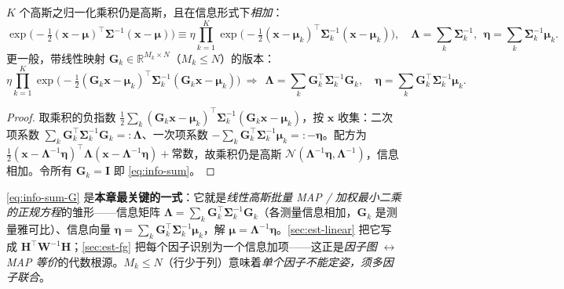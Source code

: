 \begin{proposition}[高斯归一化乘积 $=$ 独立观测融合 $=$ 信息相加]\label{prop:info-add}
$K$ 个高斯之归一化乘积仍是高斯，且在信息形式下\emph{相加}：
\begin{equation}
  \exp\!\Big(-\tfrac12(\mathbf{x}-\boldsymbol{\mu})^\top\boldsymbol{\Sigma}^{-1}(\mathbf{x}-\boldsymbol{\mu})\Big)
  \equiv\eta\prod_{k=1}^{K}\exp\!\Big(-\tfrac12(\mathbf{x}-\boldsymbol{\mu}_k)^\top\boldsymbol{\Sigma}_k^{-1}(\mathbf{x}-\boldsymbol{\mu}_k)\Big),
  \quad
  \boldsymbol{\Lambda}=\sum_{k}\boldsymbol{\Sigma}_k^{-1},\ \ \boldsymbol{\eta}=\sum_{k}\boldsymbol{\Sigma}_k^{-1}\boldsymbol{\mu}_k.
  \label{eq:info-sum}
\end{equation}
更一般，带线性映射 $\mathbf{G}_k\in\mathbb{R}^{M_k\times N}$（$M_k\le N$）的版本：
\begin{equation}
  \eta\prod_{k=1}^{K}\exp\!\Big(-\tfrac12(\mathbf{G}_k\mathbf{x}-\boldsymbol{\mu}_k)^\top\boldsymbol{\Sigma}_k^{-1}(\mathbf{G}_k\mathbf{x}-\boldsymbol{\mu}_k)\Big)
  \ \Rightarrow\
  \boxed{\ \boldsymbol{\Lambda}=\sum_{k}\mathbf{G}_k^\top\boldsymbol{\Sigma}_k^{-1}\mathbf{G}_k,\quad
  \boldsymbol{\eta}=\sum_{k}\mathbf{G}_k^\top\boldsymbol{\Sigma}_k^{-1}\boldsymbol{\mu}_k.\ }
  \label{eq:info-sum-G}
\end{equation}
\end{proposition}
\begin{proof}
取乘积的负指数 $\tfrac12\sum_k(\mathbf{G}_k\mathbf{x}-\boldsymbol{\mu}_k)^\top\boldsymbol{\Sigma}_k^{-1}(\mathbf{G}_k\mathbf{x}-\boldsymbol{\mu}_k)$，按 $\mathbf{x}$ 收集：二次项系数 $\sum_k\mathbf{G}_k^\top\boldsymbol{\Sigma}_k^{-1}\mathbf{G}_k=:\boldsymbol{\Lambda}$、一次项系数 $-\sum_k\mathbf{G}_k^\top\boldsymbol{\Sigma}_k^{-1}\boldsymbol{\mu}_k=:-\boldsymbol{\eta}$。配方为 $\tfrac12(\mathbf{x}-\boldsymbol{\Lambda}^{-1}\boldsymbol{\eta})^\top\boldsymbol{\Lambda}(\mathbf{x}-\boldsymbol{\Lambda}^{-1}\boldsymbol{\eta})+\text{常数}$，故乘积仍是高斯 $\mathcal{N}(\boldsymbol{\Lambda}^{-1}\boldsymbol{\eta},\boldsymbol{\Lambda}^{-1})$，信息相加。令所有 $\mathbf{G}_k=\mathbf{I}$ 即 \cref{eq:info-sum}。
\end{proof}
\noindent\cref{eq:info-sum-G} 是\textbf{本章最关键的一式}：它就是\emph{线性高斯批量 MAP / 加权最小二乘的正规方程}的雏形——信息矩阵 $\boldsymbol{\Lambda}=\sum_k\mathbf{G}_k^\top\boldsymbol{\Sigma}_k^{-1}\mathbf{G}_k$（各测量信息相加，$\mathbf{G}_k$ 是测量雅可比）、信息向量 $\boldsymbol{\eta}=\sum_k\mathbf{G}_k^\top\boldsymbol{\Sigma}_k^{-1}\boldsymbol{\mu}_k$，解 $\boldsymbol{\mu}=\boldsymbol{\Lambda}^{-1}\boldsymbol{\eta}$。\cref{sec:est-linear} 把它写成 $\mathbf{H}^\top\mathbf{W}^{-1}\mathbf{H}$；\cref{sec:est-fg} 把每个因子识别为一个信息加项——这正是\emph{因子图 $\leftrightarrow$ MAP 等价}的代数根源。$M_k\le N$（行少于列）意味着\emph{单个因子不能定姿，须多因子联合}。

